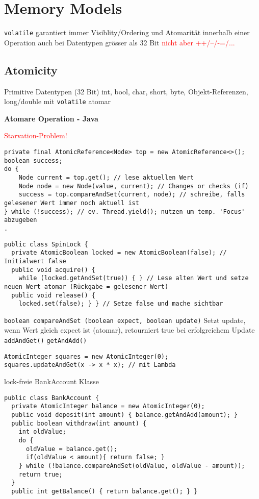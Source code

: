 \section{Memory Models}

\lstinline{volatile} garantiert immer Visiblity/Ordering und Atomarität innerhalb einer Operation auch bei Datentypen grösser als 32 Bit \textcolor{red}{nicht aber ++/--/-=/...}

\subsection{Atomicity}
Primitive Datentypen (32 Bit) int, bool, char, short, byte, Objekt-Referenzen, long/double mit \lstinline{volatile} atomar


\textbf{Atomare Operation - Java}

\textcolor{red}{Starvation-Problem!}

\begin{lstlisting}
private final AtomicReference<Node> top = new AtomicReference<>();
boolean success;
do {
    Node current = top.get(); // lese aktuellen Wert
    Node node = new Node(value, current); // Changes or checks (if)
    success = top.compareAndSet(current, node); // schreibe, falls gelesener Wert immer noch aktuell ist
} while (!success); // ev. Thread.yield(); nutzen um temp. 'Focus' abzugeben
.
\end{lstlisting}

\begin{lstlisting}
public class SpinLock {
  private AtomicBoolean locked = new AtomicBoolean(false); // Initialwert false
  public void acquire() {
    while (locked.getAndSet(true)) { } // Lese alten Wert und setze neuen Wert atomar (Rückgabe = gelesener Wert)
  public void release() {
    locked.set(false); } } // Setze false und mache sichtbar
\end{lstlisting}

\lstinline{boolean compareAndSet (boolean expect, boolean update)} Setzt update, wenn Wert gleich expect ist (atomar), retourniert true bei erfolgreichem Update \lstinline{addAndGet()} \lstinline{getAndAdd()}

\begin{lstlisting}
AtomicInteger squares = new AtomicInteger(0);
squares.updateAndGet(x -> x * x); // mit Lambda
\end{lstlisting}

lock-freie BankAccount Klasse

\begin{lstlisting}
public class BankAccount {
  private AtomicInteger balance = new AtomicInteger(0);
  public void deposit(int amount) { balance.getAndAdd(amount); }
  public boolean withdraw(int amount) {
    int oldValue;
    do {
      oldValue = balance.get();
      if(oldValue < amount){ return false; }
    } while (!balance.compareAndSet(oldValue, oldValue - amount));
    return true;
  }
  public int getBalance() { return balance.get(); } }
\end{lstlisting}

